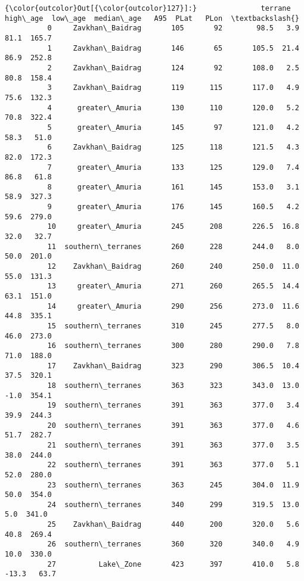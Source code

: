 \documentclass[11pt]{article}
\begin{document}
            \begin{Verbatim}[commandchars=\\\{\}]
{\color{outcolor}Out[{\color{outcolor}127}]:}               terrane  high\_age  low\_age  median\_age   A95  PLat   PLon  \textbackslash{}
          0     Zavkhan\_Baidrag       105       92        98.5   3.9  81.1  165.7   
          1     Zavkhan\_Baidrag       146       65       105.5  21.4  86.9  252.8   
          2     Zavkhan\_Baidrag       124       92       108.0   2.5  80.8  158.4   
          3     Zavkhan\_Baidrag       119      115       117.0   4.9  75.6  132.3   
          4      greater\_Amuria       130      110       120.0   5.2  70.8  322.4   
          5      greater\_Amuria       145       97       121.0   4.2  58.3   51.0   
          6     Zavkhan\_Baidrag       125      118       121.5   4.3  82.0  172.3   
          7      greater\_Amuria       133      125       129.0   7.4  86.8   61.8   
          8      greater\_Amuria       161      145       153.0   3.1  58.9  327.3   
          9      greater\_Amuria       176      145       160.5   4.2  59.6  279.0   
          10     greater\_Amuria       245      208       226.5  16.8  32.0   32.7   
          11  southern\_terranes       260      228       244.0   8.0  50.0  201.0   
          12    Zavkhan\_Baidrag       260      240       250.0  11.0  55.0  131.3   
          13     greater\_Amuria       271      260       265.5  14.4  63.1  151.0   
          14     greater\_Amuria       290      256       273.0  11.6  44.8  335.1   
          15  southern\_terranes       310      245       277.5   8.0  46.0  273.0   
          16  southern\_terranes       300      280       290.0   7.8  71.0  188.0   
          17    Zavkhan\_Baidrag       323      290       306.5  10.4  37.5  320.1   
          18  southern\_terranes       363      323       343.0  13.0  -1.0  354.1   
          19  southern\_terranes       391      363       377.0   3.4  39.9  244.3   
          20  southern\_terranes       391      363       377.0   4.6  51.7  282.7   
          21  southern\_terranes       391      363       377.0   3.5  38.0  244.0   
          22  southern\_terranes       391      363       377.0   5.1  52.0  280.0   
          23  southern\_terranes       363      245       304.0  11.9  50.0  354.0   
          24  southern\_terranes       340      299       319.5  13.0   5.0  341.0   
          25    Zavkhan\_Baidrag       440      200       320.0   5.6  40.8  269.4   
          26  southern\_terranes       360      320       340.0   4.9  10.0  330.0   
          27          Lake\_Zone       423      397       410.0   5.8 -13.3   63.7   

\end{Verbatim}
\end{document}
